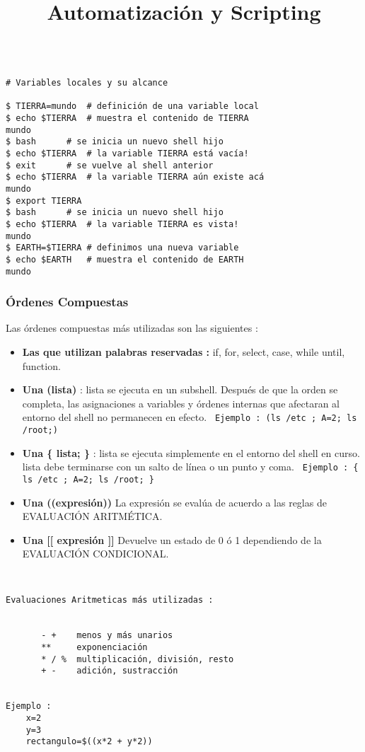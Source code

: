 \documentclass{beamer}
\title{Automatización y Scripting}
\begin{document}
\begin{frame}
  \titlepage

\end{frame}





\begin{Verbatim}

# Variables locales y su alcance

$ TIERRA=mundo	# definición de una variable local
$ echo $TIERRA	# muestra el contenido de TIERRA
mundo
$ bash		# se inicia un nuevo shell hijo
$ echo $TIERRA	# la variable TIERRA está vacía!
$ exit		# se vuelve al shell anterior
$ echo $TIERRA	# la variable TIERRA aún existe acá
mundo
$ export TIERRA
$ bash		# se inicia un nuevo shell hijo
$ echo $TIERRA	# la variable TIERRA es vista!
mundo
$ EARTH=$TIERRA	# definimos una nueva variable
$ echo $EARTH	# muestra el contenido de EARTH
mundo
\end{Verbatim}

\begin{frame}{}
\frametitle{Órdenes Compuestas}
Las órdenes compuestas más utilizadas son las siguientes :
\begin{itemize}
\item \textbf{Las que utilizan palabras reservadas : } if, for, select, case, while until, function.
\item \textbf{Una (lista) }: lista  se  ejecuta  en  un subshell. Después de que la orden se completa, las asignaciones a variables y órdenes internas que afectaran al
              entorno del shell no permanecen en efecto.
\texttt{ Ejemplo :  (ls /etc ; A=2; ls /root;) }
\item \textbf{Una \{ lista; \} }: 
              lista se ejecuta simplemente en el entorno del shell en curso.  lista debe terminarse con un salto de línea o un punto y  coma.
\texttt{ Ejemplo :  \{ ls /etc ; A=2; ls /root; \} }
\item
\textbf{Una ((expresión)) } La expresión se evalúa de acuerdo a las reglas de EVALUACIÓN ARITMÉTICA.  
\item
\textbf{Una [[ expresión ]] } Devuelve un estado de 0 ó 1 dependiendo de la EVALUACIÓN CONDICIONAL. 
\end{itemize}
\end{frame}{}



\begin{Verbatim}


Evaluaciones Aritmeticas más utilizadas :


       - +    menos y más unarios
       **     exponenciación
       * / %  multiplicación, división, resto
       + -    adición, sustracción


Ejemplo :
	x=2
	y=3
	rectangulo=$((x*2 + y*2))
\end{Verbatim}
\end{document}
